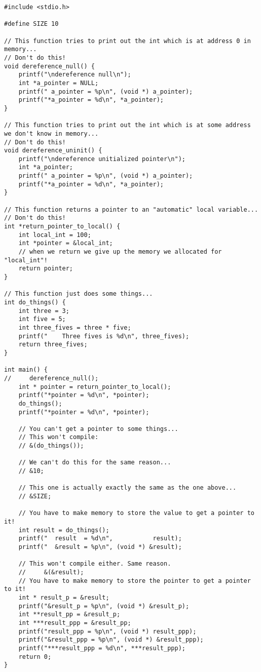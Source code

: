 \documentclass[11pt]{article}
\begin{document}
\begin{verbatim}
#include <stdio.h>

#define SIZE 10

// This function tries to print out the int which is at address 0 in memory...
// Don't do this!
void dereference_null() {
    printf("\ndereference null\n");
    int *a_pointer = NULL;
    printf(" a_pointer = %p\n", (void *) a_pointer);
    printf("*a_pointer = %d\n", *a_pointer);
}

// This function tries to print out the int which is at some address we don't know in memory...
// Don't do this!
void dereference_uninit() {
    printf("\ndereference unitialized pointer\n");
    int *a_pointer;
    printf(" a_pointer = %p\n", (void *) a_pointer);
    printf("*a_pointer = %d\n", *a_pointer);
}

// This function returns a pointer to an "automatic" local variable...
// Don't do this!
int *return_pointer_to_local() {
    int local_int = 100;
    int *pointer = &local_int;
    // when we return we give up the memory we allocated for "local_int"!
    return pointer;
}

// This function just does some things...
int do_things() {
    int three = 3;
    int five = 5;
    int three_fives = three * five;
    printf("    Three fives is %d\n", three_fives);
    return three_fives;
}

int main() {
//     dereference_null();
    int * pointer = return_pointer_to_local();
    printf("*pointer = %d\n", *pointer);
    do_things();
    printf("*pointer = %d\n", *pointer);

    // You can't get a pointer to some things...
    // This won't compile:
    // &(do_things());

    // We can't do this for the same reason...
    // &10;

    // This one is actually exactly the same as the one above...
    // &SIZE;

    // You have to make memory to store the value to get a pointer to it!
    int result = do_things();
    printf("  result  = %d\n",           result);
    printf("  &result = %p\n", (void *) &result);

    // This won't compile either. Same reason.
    //     &(&result);
    // You have to make memory to store the pointer to get a pointer to it!
    int * result_p = &result;
    printf("&result_p = %p\n", (void *) &result_p);
    int **result_pp = &result_p;
    int ***result_ppp = &result_pp;
    printf("result_ppp = %p\n", (void *) result_ppp);
    printf("&result_ppp = %p\n", (void *) &result_ppp);
    printf("***result_ppp = %d\n", ***result_ppp);
    return 0;
}
\end{verbatim}
\end{document}
